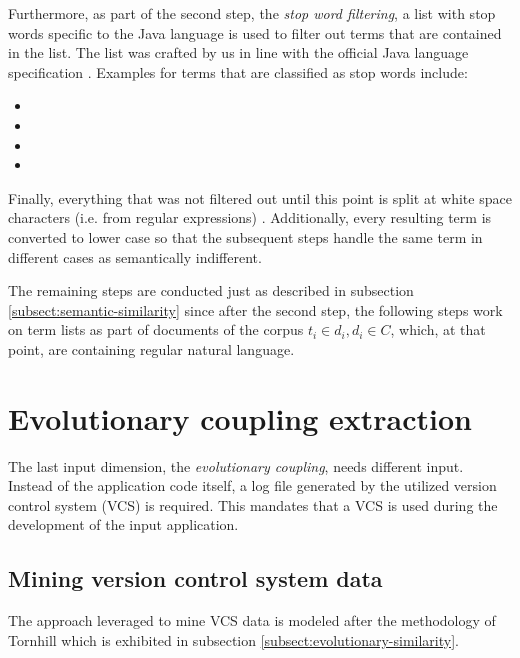 \documentclass[12pt,a4paper]{report}
\begin{document}
Furthermore, as part of the second step, the \textit{stop word filtering},
a list with stop words specific to the Java language is used to filter out
terms that are contained in the list. The list was crafted by us in line with
the official Java language specification \cite{oracle-java11}.
Examples for terms that are classified as stop words include:
\begin{itemize}[noitemsep]
  \item {}
  \item {}
  \item {}
  \item {}
\end{itemize}

Finally, everything that was not filtered out until this point is split
at white space characters (i.e.  from regular expressions)
\cite{ieee1992posix}.
Additionally, every resulting term is converted to lower case so that
the subsequent steps handle the same term in different cases as
semantically indifferent.

The remaining steps are conducted just as described in subsection
\ref{subsect:semantic-similarity} since after the second step,
the following steps work on term lists as part of documents of the corpus
\(t_i \in d_i, d_i \in C\), which, at that point, are containing regular natural language.



\section{Evolutionary coupling extraction} \label{sect:evolutionary-coupling-extraction}

The last input dimension, the \textit{evolutionary coupling}, needs different
input. Instead of the application code itself, a log file generated by the
utilized version control system (VCS) is required.
This mandates that a VCS is used during the development of the input application.


\subsection{Mining version control system data}

The approach leveraged to mine VCS data is modeled after the methodology of
Tornhill \cite{tornhill2015crimescene} which is exhibited in subsection
\ref{subsect:evolutionary-similarity}.
\end{document}
